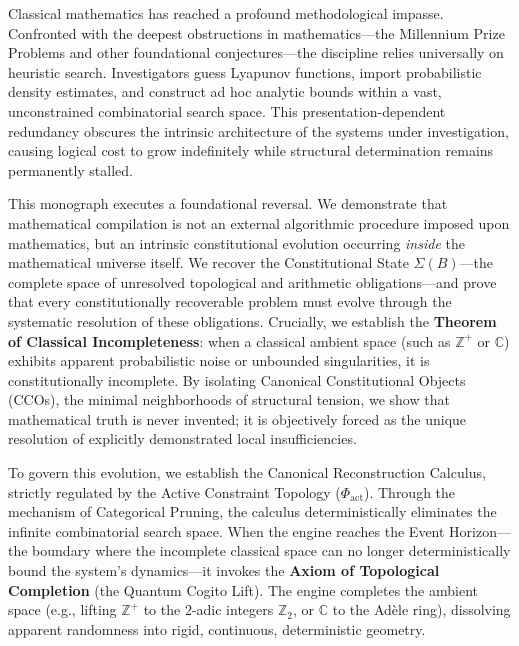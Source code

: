 \documentclass[12pt,openany]{extbook}
\theoremstyle{plain}
\theoremstyle{definition}
\begin{document}
Classical mathematics has reached a profound methodological impasse. Confronted with the deepest obstructions in mathematics---the Millennium Prize Problems and other foundational conjectures---the discipline relies universally on heuristic search. Investigators guess Lyapunov functions, import probabilistic density estimates, and construct ad hoc analytic bounds within a vast, unconstrained combinatorial search space. This presentation-dependent redundancy obscures the intrinsic architecture of the systems under investigation, causing logical cost to grow indefinitely while structural determination remains permanently stalled.

This monograph executes a foundational reversal. We demonstrate that mathematical compilation is not an external algorithmic procedure imposed upon mathematics, but an intrinsic constitutional evolution occurring \emph{inside} the mathematical universe itself. We recover the Constitutional State $\Sigma(B)$---the complete space of unresolved topological and arithmetic obligations---and prove that every constitutionally recoverable problem must evolve through the systematic resolution of these obligations. Crucially, we establish the \textbf{Theorem of Classical Incompleteness}: when a classical ambient space (such as $\mathbb{Z}^+$ or $\mathbb{C}$) exhibits apparent probabilistic noise or unbounded singularities, it is constitutionally incomplete. By isolating Canonical Constitutional Objects (CCOs), the minimal neighborhoods of structural tension, we show that mathematical truth is never invented; it is objectively forced as the unique resolution of explicitly demonstrated local insufficiencies.

To govern this evolution, we establish the Canonical Reconstruction Calculus, strictly regulated by the Active Constraint Topology ($\Phi_{\mathrm{act}}$). Through the mechanism of Categorical Pruning, the calculus deterministically eliminates the infinite combinatorial search space. When the engine reaches the Event Horizon---the boundary where the incomplete classical space can no longer deterministically bound the system's dynamics---it invokes the \textbf{Axiom of Topological Completion} (the Quantum Cogito Lift). The engine completes the ambient space (e.g., lifting $\mathbb{Z}^+$ to the $2$-adic integers $\mathbb{Z}_2$, or $\mathbb{C}$ to the Ad\`ele ring), dissolving apparent randomness into rigid, continuous, deterministic geometry.
\end{document}

